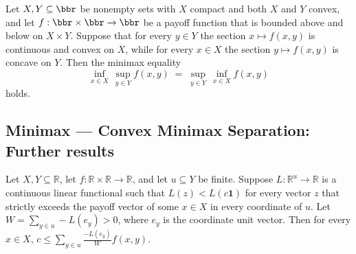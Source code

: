 \begin{theorem}
\label{OnlineLearning.convex_compact_minimax_by_separation}
\leanok
{}
Let $X, Y \subseteq \bbr$ be nonempty sets with $X$ compact and both $X$ and $Y$ convex,
and let $f : \bbr \times \bbr \to \bbr$ be a payoff function that is bounded above and
below on $X \times Y$. Suppose that for every $y \in Y$ the section $x \mapsto f(x,y)$
is continuous and convex on $X$, while for every $x \in X$ the section $y \mapsto
f(x,y)$ is concave on $Y$. Then the minimax equality
\[
  \inf_{x \in X}\,\sup_{y \in Y} f(x,y)
  \;=\;
  \sup_{y \in Y}\,\inf_{x \in X} f(x,y)
\]
holds.
\end{theorem}

\subsection*{Minimax --- Convex Minimax Separation: Further results}

\begin{lemma}
\label{OnlineLearning.separating_functional_normalized_le}
\leanok
{}
Let $X,Y\subseteq\mathbb{R}$, let $f:\mathbb{R}\times\mathbb{R}\to\mathbb{R}$, and let
$u\subseteq Y$ be finite. Suppose $L:\mathbb{R}^{u}\to\mathbb{R}$ is a continuous linear
functional such that $L(z)<L(c\mathbf{1})$ for every vector $z$ that strictly exceeds
the payoff vector of some $x\in X$ in every coordinate of $u$. Let $W=\sum_{y\in
u}-L(e_y)>0$, where $e_y$ is the coordinate unit vector. Then for every $x\in X$,
$c\le\sum_{y\in u}\frac{-L(e_y)}{W}f(x,y)$.
\end{lemma}
